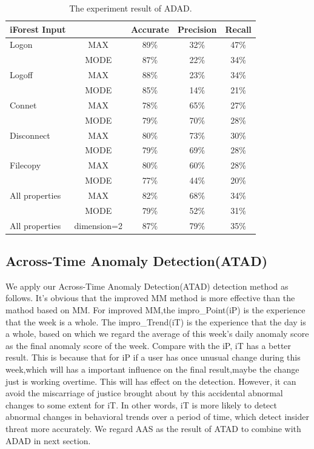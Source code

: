\documentclass[conference]{IEEEtran}
\begin{document}
\begin{table}[tbp]
\caption{The experiment result of ADAD.}
\centering  %
\begin{tabular}{lcccc}  %
\hline
iForest Input & 	&Accurate &Precision &Recall\\ \hline
	
Logon 	& MAX &89\% &32\% &47\%\\
  & MODE &87\% &22\% &34\%\\\hline
Logoff 	& MAX &88\% &23\% &34\%\\
   & MODE &85\% &14\% &21\%\\\hline
Connet 	& MAX &78\% &65\% &27\%\\
  & MODE &79\% &70\% &28\%\\\hline
Disconnect 	& MAX &80\% &73\% &30\%\\
  & MODE &79\% &69\% &28\%\\\hline
Filecopy 	& MAX &80\% &60\% &28\%\\
  & MODE &77\% &44\% &20\%\\\hline
All properties 	& MAX &82\% &68\% &34\%\\
  & MODE &79\% &52\% &31\%\\\hline
All properties 	& dimension=2 &87\% &79\% &35\%\\\hline

\end{tabular}

\end{table}


\subsection{Across-Time Anomaly Detection(ATAD)}


We apply our Across-Time Anomaly Detection(ATAD) detection method as follows. It's obvious that the improved MM method is more effective than the mathod based on MM. For improved MM,the impro\_Point(iP) is the experience that the week is a whole. The impro\_Trend(iT) is the experience that the day is a whole, based on which we regard the average of this week's daily anomaly score as the final anomaly score of the week. Compare with the iP, iT has a better result. This is because that for  iP if a user has once unusual change during this week,which will has a important influence on the final result,maybe the change just is working overtime. This will has effect on the detection. However, it can avoid the miscarriage of justice brought about by this accidental abnormal changes to some extent for  iT. In other words,  iT is more likely to detect abnormal changes in behavioral trends over a period of time, which detect insider threat more accurately. We regard AAS as the result of ATAD to combine with ADAD in next section.
\end{document}
